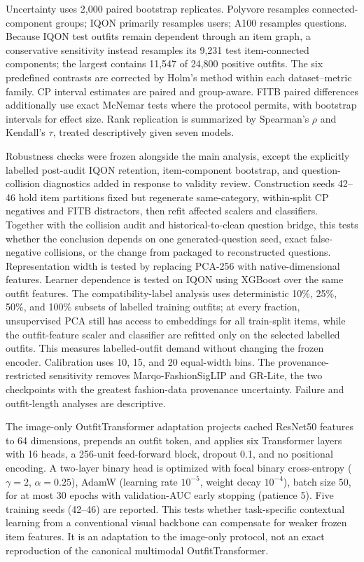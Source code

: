 \documentclass[pdflatex,sn-mathphys-num,iicol]{sn-jnl}
\begin{document}
Uncertainty uses 2,000 paired bootstrap replicates. Polyvore resamples connected-component groups; IQON primarily resamples users; A100 resamples questions. Because IQON test outfits remain dependent through an item graph, a conservative sensitivity instead resamples its 9,231 test item-connected components; the largest contains 11,547 of 24,800 positive outfits. The six predefined contrasts are corrected by Holm's method within each dataset--metric family. CP interval estimates are paired and group-aware. FITB paired differences additionally use exact McNemar tests where the protocol permits, with bootstrap intervals for effect size. Rank replication is summarized by Spearman's $\rho$ and Kendall's $\tau$, treated descriptively given seven models.

Robustness checks were frozen alongside the main analysis, except the explicitly labelled post-audit IQON retention, item-component bootstrap, and question-collision diagnostics added in response to validity review. Construction seeds 42--46 hold item partitions fixed but regenerate same-category, within-split CP negatives and FITB distractors, then refit affected scalers and classifiers. Together with the collision audit and historical-to-clean question bridge, this tests whether the conclusion depends on one generated-question seed, exact false-negative collisions, or the change from packaged to reconstructed questions. Representation width is tested by replacing PCA-256 with native-dimensional features. Learner dependence is tested on IQON using XGBoost over the same outfit features. The compatibility-label analysis uses deterministic 10\%, 25\%, 50\%, and 100\% subsets of labelled training outfits; at every fraction, unsupervised PCA still has access to embeddings for all train-split items, while the outfit-feature scaler and classifier are refitted only on the selected labelled outfits. This measures labelled-outfit demand without changing the frozen encoder. Calibration uses 10, 15, and 20 equal-width bins. The provenance-restricted sensitivity removes Marqo-FashionSigLIP and GR-Lite, the two checkpoints with the greatest fashion-data provenance uncertainty. Failure and outfit-length analyses are descriptive.

The image-only OutfitTransformer adaptation projects cached ResNet50 features to 64 dimensions, prepends an outfit token, and applies six Transformer layers with 16 heads, a 256-unit feed-forward block, dropout 0.1, and no positional encoding. A two-layer binary head is optimized with focal binary cross-entropy ($\gamma=2$, $\alpha=0.25$), AdamW (learning rate $10^{-5}$, weight decay $10^{-4}$), batch size 50, for at most 30 epochs with validation-AUC early stopping (patience 5). Five training seeds (42--46) are reported. This tests whether task-specific contextual learning from a conventional visual backbone can compensate for weaker frozen item features. It is an adaptation to the image-only protocol, not an exact reproduction of the canonical multimodal OutfitTransformer.
\end{document}
